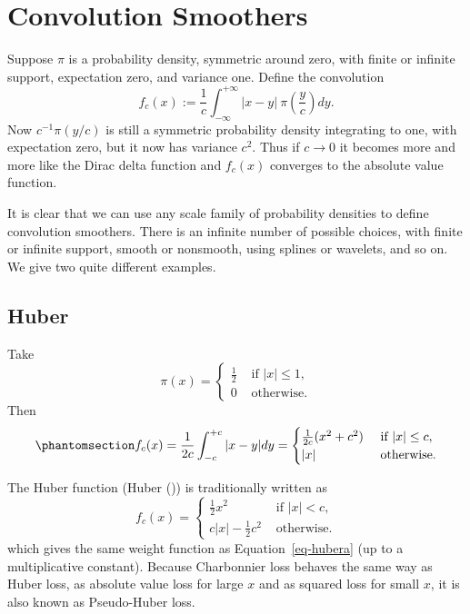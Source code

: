 \documentclass[
  12pt,
  letterpaper,
  DIV=11,
  numbers=noendperiod]{scrartcl}
\theoremstyle{plain}
\theoremstyle{plain}
\theoremstyle{plain}
\theoremstyle{definition}
\theoremstyle{remark}
\begin{document}
\section{Convolution Smoothers}\label{convolution-smoothers}

Suppose \(\pi\) is a probability density, symmetric around zero, with
finite or infinite support, expectation zero, and variance one. Define
the convolution \[
f_c(x):=\frac{1}{c}\int_{-\infty}^{+\infty}|x-y|\ \pi(\frac{y}{c})dy.
\] Now \(c^{-1}\pi(y/c)\) is still a symmetric probability density
integrating to one, with expectation zero, but it now has variance
\(c^2\). Thus if \(c\rightarrow 0\) it becomes more and more like the
Dirac delta function and \(f_c(x)\) converges to the absolute value
function.

It is clear that we can use any scale family of probability densities to
define convolution smoothers. There is an infinite number of possible
choices, with finite or infinite support, smooth or nonsmooth, using
splines or wavelets, and so on. We give two quite different examples.

\subsection{Huber}\label{huber}

Take \[
\pi(x)=\begin{cases}\frac12 &\text{ if }|x|\leq 1,\\0&\text{ otherwise.}\end{cases}
\] Then \begin{equation}\phantomsection\label{eq-hubera}{
f_c(x)=\frac{1}{2c}\int_{-c}^{+c}|x-y|dy=\begin{cases}
\frac{1}{2c}(x^2+c^2)&\text{ if }|x|\leq c,\\
|x|&\text{ otherwise}.
\end{cases}
}\end{equation}

The Huber function (Huber ()) is
traditionally written as \begin{equation}
f_c(x)=\begin{cases}
\frac12x^2&\text{ if }|x|<c,\\
c|x|-\frac12 c^2&\text{ otherwise}.
\end{cases}
\end{equation} which gives the same weight function as
Equation~\ref{eq-hubera} (up to a multiplicative constant). Because
Charbonnier loss behaves the same way as Huber loss, as absolute value
loss for large \(x\) and as squared loss for small \(x\), it is also
known as Pseudo-Huber loss.
\end{document}
